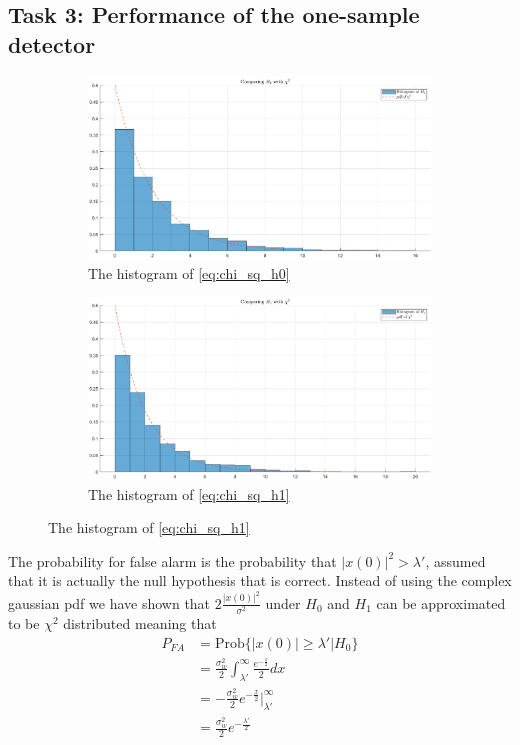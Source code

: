 \subsection{Task 3: Performance of the one-sample detector}
\begin{figure}[ht]
    \begin{subfigure}{.5\textwidth}
        \centering
        \includegraphics[width=.8\linewidth]{figures/chi_square_h0.eps}  
        \caption{The histogram of \eqref{eq:chi_sq_h0}}
        \label{fig:chi_sq_h0}
    \end{subfigure}
    \begin{subfigure}{.5\textwidth}
        \centering
        \includegraphics[width=.8\linewidth]{figures/chi_square_h1.eps}  
        \caption{The histogram of \eqref{eq:chi_sq_h1}}
        \label{fig:chi_sq_h1}
    \end{subfigure}
\end{figure}
The probability for false alarm is the probability that $|x(0)|^2>\lambda'$, assumed that it is actually the null hypothesis that is correct. Instead of using the complex gaussian pdf we have shown that $2\frac{|x(0)|^2}{\sigma^2}$ under $H_0$ and $H_1$ can be approximated to be $\chi^2$ distributed meaning that
\begin{align}
    P_{FA} & = \text{Prob}\{|x(0)|\geq\lambda'\vert H_0\}\nonumber\\
    & = \frac{\sigma_w^2}{2}\int_{\lambda'}^{\infty}\frac{e^{-\frac{x}{2}}}{2}dx\nonumber\\
    & = -\frac{\sigma_w^2}{2}e^{-\frac{x}{2}}\bigg\rvert_{\lambda'}^{\infty}\nonumber\\
    & = \frac{\sigma_w^2}{2}e^{-\frac{\lambda'}{2}}\nonumber
\end{align}
